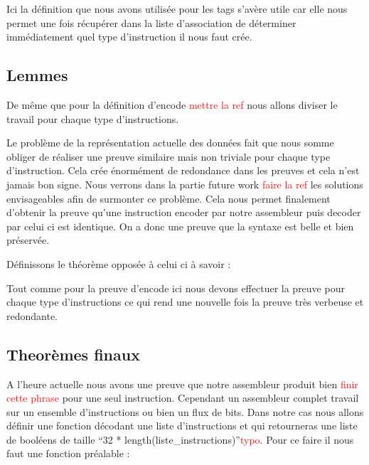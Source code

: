 \documentclass {article}
\newcommand{\codefrom}[3]
           {}
\theoremstyle{definition}
\theoremstyle{remark}
\newcommand{\todo}[1]{\textcolor{red}{#1}}
\begin{document}
Ici la définition que nous avons utilisée pour les tags s'avère utile car elle nous permet
une fois récupérer dans la liste d'association de déterminer immédiatement quel type
d'instruction il nous faut crée.





\subsection{Lemmes}
\label{LemmesEncode}
De même que pour la définition d'encode \todo{mettre la ref} nous allons diviser le travail pour chaque
type d'instructions.

\codefrom{src}{encodeProof}{encode_decode_t_n}

Le problème de la représentation actuelle des données fait que nous somme obliger de réaliser une preuve
similaire mais non triviale pour chaque type d'instruction. Cela crée énormément de redondance dans les preuves
et cela n'est jamais bon signe. Nous verrons dans la partie future work \todo{faire la ref} les solutions envisageables afin
de surmonter ce problème.
Cela nous permet finalement d'obtenir la preuve qu'une instruction encoder par notre assembleur puis decoder par celui
ci est identique. On a donc une preuve que la syntaxe est belle et bien préservée.

Définissons le théorème opposée à celui ci à savoir :

\codefrom{src}{encodeProof}{decode_encode}

Tout comme pour la preuve d'encode ici nous devons effectuer la preuve pour chaque type d'instructions
ce qui rend une nouvelle fois la preuve très verbeuse et redondante. 




\subsection{Theorèmes finaux}

A l'heure actuelle nous avons une preuve que notre assembleur produit bien \todo{finir cette phrase}
pour une seul instruction. Cependant un assembleur complet travail sur un ensemble d'instructions
ou bien un flux de bits. Dans notre cas nous allons définir une fonction décodant une liste d'instructions et qui
retourneras une liste de booléens de taille ``32 * length(liste\_instructions)''\todo{typo}.
Pour ce faire il nous faut une fonction préalable :
\end{document}
